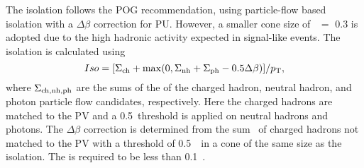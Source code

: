 The isolation follows the POG recommendation, using particle-flow based        
isolation with a $\Delta\beta$ correction for PU. However, a smaller cone      
size of \DR\ $=$ 0.3 is adopted due to the high hadronic activity expected in  
signal-like events. The isolation is calculated using                             
$$
Iso = [ \Sigma_{\rm ch} + {\rm max}(0, \Sigma_{\rm nh} + \Sigma_{\rm ph} - 0.5 \Delta\beta) ]/p_{\mathrm{T}},
$$
where $\Sigma_{\rm ch, nh, ph}$ are the sums of the \pt of the charged hadron,
neutral hadron, and photon particle flow candidates, respectively. Here the
charged hadrons are matched to the PV and a 0.5~\GeV threshold is applied
on neutral hadrons and photons. The $\Delta\beta$ correction is determined
from the sum \pt\ of charged hadrons not matched to the PV with a threshold of
0.5~\GeV\ in a cone of the same size as the isolation. The \relIso is required
to be less than 0.1~\cite{muonpfisotwiki}.
